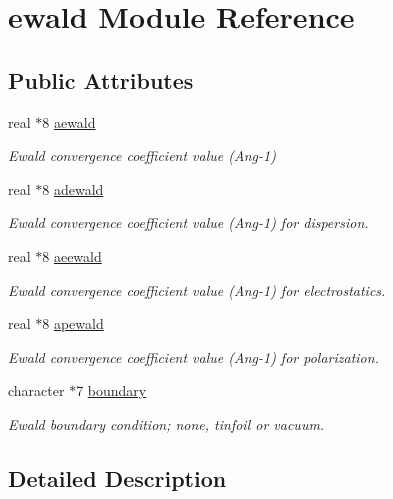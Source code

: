\hypertarget{classewald}{\section{ewald Module Reference}
\label{classewald}
}
\subsection*{Public Attributes}
\begin{DoxyCompactItemize}
\item 
real $\ast$8 \hyperlink{classewald_ae9a0f8ffb1b81515f022739140019848}{aewald}
\begin{DoxyCompactList}\small\item\em Ewald convergence coefficient value (Ang-\/1) \end{DoxyCompactList}\item 
real $\ast$8 \hyperlink{classewald_a51905d59653a49a01964584ae92ff5cc}{adewald}
\begin{DoxyCompactList}\small\item\em Ewald convergence coefficient value (Ang-\/1) for dispersion. \end{DoxyCompactList}\item 
real $\ast$8 \hyperlink{classewald_ad5ce1eeff5b35e8cf29d2948e5146e5f}{aeewald}
\begin{DoxyCompactList}\small\item\em Ewald convergence coefficient value (Ang-\/1) for electrostatics. \end{DoxyCompactList}\item 
real $\ast$8 \hyperlink{classewald_a8def5c80c49373aeac67bd04371dce79}{apewald}
\begin{DoxyCompactList}\small\item\em Ewald convergence coefficient value (Ang-\/1) for polarization. \end{DoxyCompactList}\item 
character $\ast$7 \hyperlink{classewald_ad3dc914487ee77252267f5294ed6b19f}{boundary}
\begin{DoxyCompactList}\small\item\em Ewald boundary condition; none, tinfoil or vacuum. \end{DoxyCompactList}\end{DoxyCompactItemize}


\subsection{Detailed Description}



